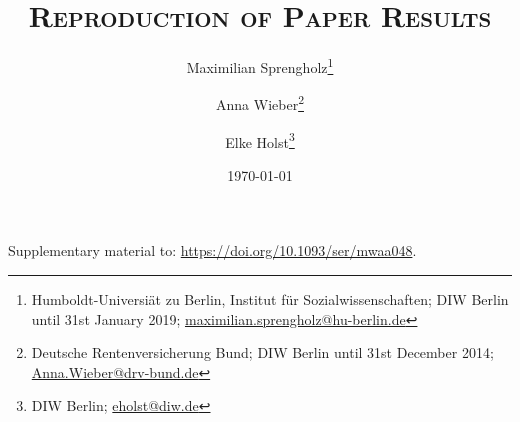 \documentclass[a4paper,11pt]{scrartcl}
\begin{document}
\clearpage
{}
\pagestyle{plain}
\setcounter{page}{1}

\begin{titlepage}

	\title{\scshape{Reproduction of Paper Results}}
	\subtitle{}
	\author{Maximilian Sprengholz\thanks{Humboldt-Universiät zu Berlin, Institut für Sozialwissenschaften; DIW Berlin until 31st January 2019; \href{mailto:maximilian.sprengholz@hu-berlin.de}{maximilian.sprengholz@hu-berlin.de}} \and Anna Wieber\thanks{Deutsche Rentenversicherung Bund; DIW Berlin until 31st December 2014; \href{mailto:Anna.Wieber@drv-bund.de}{Anna.Wieber@drv-bund.de}} \and Elke Holst\thanks{DIW Berlin; \href{mailto:eholst@diw.de}{eholst@diw.de}}}

	\date{\today}

	\maketitle

	\centering
	Supplementary material to: \href{https://doi.org/10.1093/ser/mwaa048}{https://doi.org/10.1093/ser/mwaa048}.
\end{titlepage}

%
%
\end{document}
